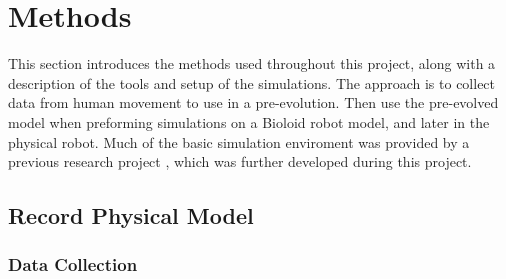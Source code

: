 \section{Methods}
This section introduces the methods used throughout this project, along with a description of the tools and setup of the simulations. The approach is to collect data from human movement to use in a pre-evolution. Then use the pre-evolved model when preforming simulations on a Bioloid robot model, and later in the physical robot. Much of the basic simulation enviroment was provided by a previous research project \cite{studentProj}, which was further developed during this project.



\subsection{Record Physical Model} \label{recordPhysicalModel}

\subsubsection{Data Collection}



